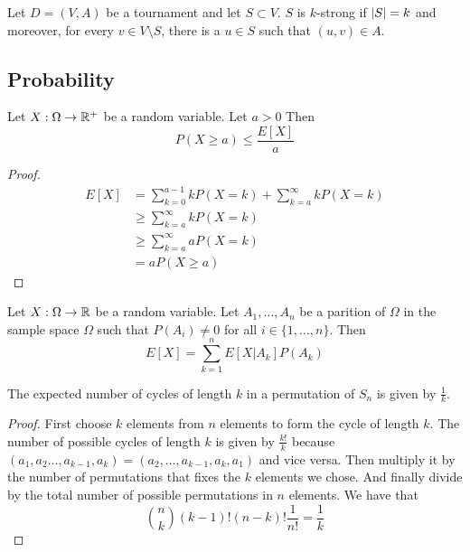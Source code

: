 \documentclass[a4paper]{article}
\begin{document}
\begin{defn} Let $D=(V,A)$ be a tournament and let $S\subset V$. $S$ is $k$-strong if $\abs{S}=k$ and moreover, for every $v\in V\setminus S$, there is a $u\in S$ such that $(u,v)\in A$. 
\end{defn}

\subsection{Probability}
\begin{thm} Let $X:\Omega\to\mathbb{R}^+$ be a random variable. Let $a>0$ Then $$P(X\geq a)\leq\frac{E[X]}{a}$$
\end{thm}
\begin{proof} 
\begin{align*}
E[X]&=\sum_{k=0}^{a-1}kP(X=k)+\sum_{k=a}^\infty kP(X=k)\\
&\geq\sum_{k=a}^\infty kP(X=k)\\
&\geq\sum_{k=a}^\infty aP(X=k)\\
&=aP(X\geq a)
\end{align*}
\end{proof}

\begin{thm} Let $X:\Omega\to\mathbb{R}$ be a random variable. Let $A_1,\dots,A_n$ be a parition of $\Omega$ in the sample space $\Omega$ such that $P(A_i)\neq0$ for all $i\in\{1,\dots,n\}$. Then $$E[X]=\sum_{k=1}^nE[X|A_k]P(A_k)$$
\end{thm}

\begin{thm} The expected number of cycles of length $k$ in a permutation of $S_n$ is given by $\frac{1}{k}$. 
\end{thm}
\begin{proof} First choose $k$ elements from $n$ elements to form the cycle of length $k$. The number of possible cycles of length $k$ is given by $\frac{k!}{k}$ because $(a_1,a_2\dots,a_{k-1},a_k)=(a_2,\dots,a_{k-1},a_k,a_1)$ and vice versa. Then multiply it by the number of permutations that fixes the $k$ elements we chose. And finally divide by the total number of possible permutations in $n$ elements. We have that $$\binom{n}{k}(k-1)!(n-k)!\frac{1}{n!}=\frac{1}{k}$$
\end{proof}
\end{document}

